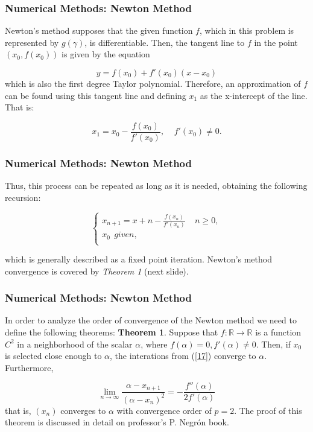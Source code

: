 \documentclass{beamer}
\begin{document}
 \begin{frame}
\frametitle{Numerical Methods: Newton Method}
    Newton's method supposes that the given function $f$, which in this problem is represented by $g(\gamma)$, is differentiable. Then, the tangent line to $f$ in the point $(x_0, f(x_0))$ is given by the equation
    
        \begin{equation}\label{15}
            y = f(x_0) + f'(x_0)(x-x_0) 
        \end{equation}
    which is also the first degree Taylor polynomial. Therefore, an approximation of $f$ can be found using this tangent line and defining $x_1$ as the x-intercept of the line. That is:

    \begin{equation}\label{16}
        x_1 = x_0 - \frac{f(x_0)}{f'(x_0)}, \ \ \ \ \ f'(x_0) \neq 0. 
    \end{equation}
\end{frame}

 \begin{frame}
\frametitle{Numerical Methods: Newton Method}
    Thus, this process can be repeated as long as it is needed, obtaining the following recursion:
    
        \begin{equation}\label{17}
            \begin{cases}
                x_{n+1} = x+n - \frac{f(x_n)}{f'(x_n)} \ \ \ \ \ n \geq 0,  \\
                x_0 \ \ given, \\
            \end{cases}
        \end{equation}
    
    which is generally described as a fixed point iteration. Newton's method convergence is covered by \textit{Theorem 1} (next slide). 
\end{frame}

 \begin{frame}
\frametitle{Numerical Methods: Newton Method}
    In order to analyze the order of convergence of the Newton method we need to define the following theorems: \newline \newline
    \noindent \textbf{Theorem 1}. Suppose that $f : \mathbb{R} \rightarrow \mathbb{R}$ is a function $C^2$ in a neighborhood of the scalar $\alpha$, where $f(\alpha) = 0, f'(\alpha) \neq 0.$ Then, if $x_0$ is selected close enough to $\alpha$, the interations from (\ref{17}) converge to $\alpha$. Furthermore,

    \begin{equation}\label{18}
        \lim_{n\to\infty} \frac{\alpha - x_{n+1}}{(\alpha - x_n)^2} = - \frac{f''(\alpha)}{2f'(\alpha)}
    \end{equation}
    \noindent that is, $(x_n)$ converges to $\alpha$ with convergence order of $p = 2$. The proof of this theorem is discussed in detail on professor's P. Negr\'{o}n book. 
\end{frame}
\end{document}
